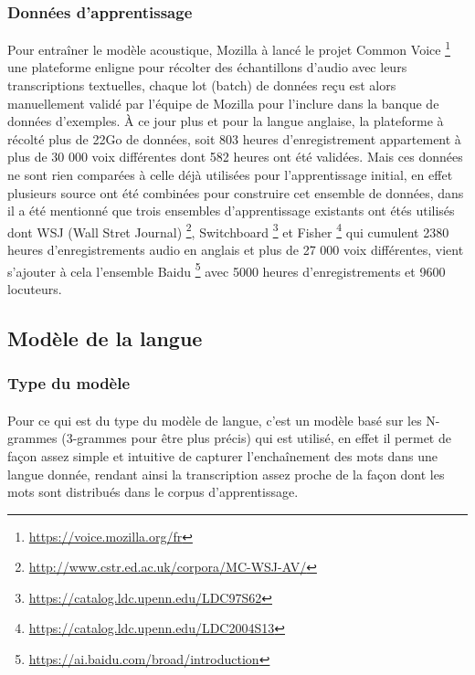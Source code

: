 		\subsubsection*{Données d'apprentissage}
		Pour entraîner le modèle acoustique, Mozilla à lancé le projet Common Voice  \footnote{\url{https://voice.mozilla.org/fr}} une plateforme enligne pour récolter des échantillons d'audio avec leurs transcriptions textuelles, chaque lot (batch) de données reçu est alors manuellement validé par l'équipe de Mozilla pour l'inclure dans la banque de données d'exemples. À ce jour plus et pour la langue anglaise, la plateforme à récolté plus de 22Go de données, soit 803 heures d'enregistrement appartement à plus de 30 000 voix différentes dont 582 heures ont été validées. Mais ces données ne sont rien comparées à celle déjà utilisées pour l'apprentissage initial, en effet plusieurs source ont été combinées pour construire cet ensemble de données, dans \cite{deepspeech_paper} il a été mentionné que trois ensembles d'apprentissage existants ont étés utilisés dont WSJ (Wall Stret Journal) \footnote{\url{http://www.cstr.ed.ac.uk/corpora/MC-WSJ-AV/}}, Switchboard \footnote{\url{https://catalog.ldc.upenn.edu/LDC97S62}} et Fisher \footnote{\url{https://catalog.ldc.upenn.edu/LDC2004S13}} qui cumulent 2380 heures d'enregistrements audio en anglais et plus de 27 000 voix différentes, vient s'ajouter à cela l'ensemble Baidu \footnote{\url{https://ai.baidu.com/broad/introduction}} avec 5000 heures d'enregistrements et 9600 locuteurs.
		
	\subsection{Modèle de la langue}
		\subsubsection*{Type du modèle}
		\paragraph{}
		Pour ce qui est du type du modèle de langue, c'est un modèle basé sur les N-grammes (3-grammes pour être plus précis) qui est utilisé, en effet il permet de façon assez simple et intuitive de capturer l'enchaînement des mots dans une langue donnée, rendant ainsi la transcription assez proche de la façon dont les mots sont distribués dans le corpus d'apprentissage.
		

